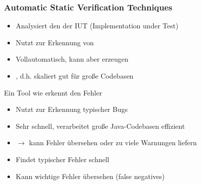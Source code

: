 \subsubsection*{Automatic Static Verification Techniques}
\begin{infoBox}[title=Static Checking (Statische Überprüfung)]
    \begin{itemize}
        \item Analysiert den  der IUT (Implementation under Test)
        \item Nutzt  zur Erkennung von 
        \item Vollautomatisch, kann aber  erzeugen
        \item {}, d.h. skaliert gut für große Codebasen
    \end{itemize}
    Ein Tool wie  erkennt den Fehler 
\end{infoBox}
\begin{infoBox}[title=Bug Finding (Fehlersuche durch Heuristiken \& Mustererkennung)]
    \begin{itemize}
        \item Nutzt  zur Erkennung typischer Bugs
        \item Sehr schnell, verarbeitet große Java-Codebasen effizient
        \item {} $\rightarrow$ kann Fehler übersehen oder zu viele Warnungen liefern
    \end{itemize}
    \begin{itemize}
        \item {} Findet typischer Fehler schnell
        \item {} Kann wichtige Fehler übersehen (false negatives)
    \end{itemize}
\end{infoBox}
